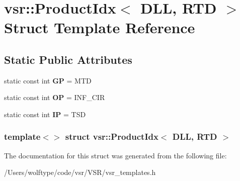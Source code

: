\hypertarget{structvsr_1_1_product_idx_3_01_d_l_l_00_01_r_t_d_01_4}{\section{vsr\-:\-:Product\-Idx$<$ D\-L\-L, R\-T\-D $>$ Struct Template Reference}
\label{structvsr_1_1_product_idx_3_01_d_l_l_00_01_r_t_d_01_4}
}
\subsection*{Static Public Attributes}
\begin{DoxyCompactItemize}
\item 
\hypertarget{structvsr_1_1_product_idx_3_01_d_l_l_00_01_r_t_d_01_4_a4c49a58642635f07d8856e80d380c90c}{static const int {\bfseries G\-P} = M\-T\-D}\label{structvsr_1_1_product_idx_3_01_d_l_l_00_01_r_t_d_01_4_a4c49a58642635f07d8856e80d380c90c}

\item 
\hypertarget{structvsr_1_1_product_idx_3_01_d_l_l_00_01_r_t_d_01_4_a8dffff7216e28a72b48e5a71acc2181f}{static const int {\bfseries O\-P} = I\-N\-F\-\_\-\-C\-I\-R}\label{structvsr_1_1_product_idx_3_01_d_l_l_00_01_r_t_d_01_4_a8dffff7216e28a72b48e5a71acc2181f}

\item 
\hypertarget{structvsr_1_1_product_idx_3_01_d_l_l_00_01_r_t_d_01_4_a900390a3ac5673087dac2e352033f3c2}{static const int {\bfseries I\-P} = T\-S\-D}\label{structvsr_1_1_product_idx_3_01_d_l_l_00_01_r_t_d_01_4_a900390a3ac5673087dac2e352033f3c2}

\end{DoxyCompactItemize}
\subsubsection*{template$<$$>$ struct vsr\-::\-Product\-Idx$<$ D\-L\-L, R\-T\-D $>$}



The documentation for this struct was generated from the following file\-:\begin{DoxyCompactItemize}
\item 
/\-Users/wolftype/code/vsr/\-V\-S\-R/vsr\-\_\-templates.\-h\end{DoxyCompactItemize}
